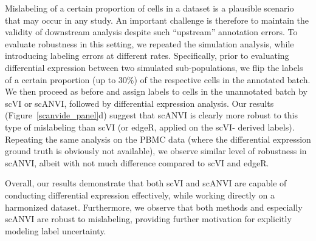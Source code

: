 Mislabeling of a certain proportion of cells in a dataset is a plausible scenario that may occur in any study. An important challenge is therefore to maintain the validity of downstream analysis despite such “upstream” annotation errors.  To evaluate robustness in this setting, we repeated the simulation analysis, while introducing labeling errors at different rates. Specifically, prior to evaluating differential expression between two simulated sub-populations, we flip the labels of a certain proportion (up to $30\%$) of the respective cells in the annotated batch. We then proceed as before and assign labels to cells in the unannotated batch by scVI or scANVI, followed by differential expression analysis. Our results (Figure~\ref{scanvide_panel}d) suggest that scANVI is clearly more robust to this type of mislabeling than scVI (or edgeR, applied on the scVI- derived labels). Repeating the same analysis on the PBMC data (where the differential expression ground truth is obviously not available), we observe similar level of robustness in scANVI, albeit with not much difference compared to scVI and edgeR. 

Overall, our results demonstrate that both scVI and scANVI are capable of conducting differential expression effectively, while working directly on a harmonized dataset. Furthermore, we observe that both methods and especially scANVI are robust to mislabeling, providing further motivation for explicitly modeling label uncertainty.
